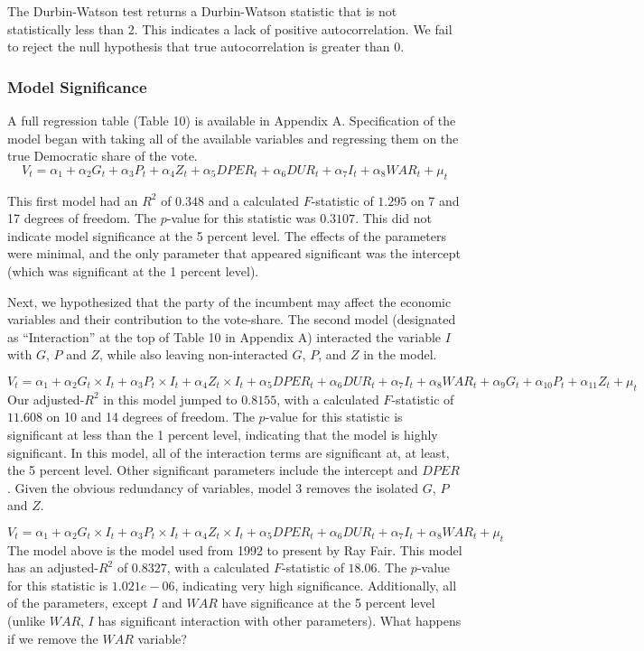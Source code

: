 \documentclass[11,]{article}
\begin{document}
The Durbin-Watson test returns a Durbin-Watson statistic that is not
statistically less than 2. This indicates a lack of positive
autocorrelation. We fail to reject the null hypothesis that true
autocorrelation is greater than 0.

\hypertarget{model-significance}{%
\subsubsection{Model Significance}\label{model-significance}}

A full regression table (Table 10) is available in Appendix A.
Specification of the model began with taking all of the available
variables and regressing them on the true Democratic share of the vote.
\[V_t = \alpha_1 + \alpha_2 G_t + \alpha_3 P_t + \alpha_4 Z_t+ \alpha_5 {DPER_t} + \alpha_6 {DUR_t} +\alpha_7 I_t + \alpha_8 {WAR_t} + \mu_t\]

This first model had an \(R^2\) of \(0.348\) and a calculated
\(F\)-statistic of \(1.295\) on 7 and 17 degrees of freedom. The
\(p\)-value for this statistic was \(0.3107\). This did not indicate
model significance at the 5 percent level. The effects of the parameters
were minimal, and the only parameter that appeared significant was the
intercept (which was significant at the 1 percent level).

Next, we hypothesized that the party of the incumbent may affect the
economic variables and their contribution to the vote-share. The second
model (designated as ``Interaction'' at the top of Table 10 in Appendix
A) interacted the variable \(I\) with \(G\), \(P\) and \(Z\), while also
leaving non-interacted \(G\), \(P\), and \(Z\) in the model.

\[V_t = \alpha_1 + \alpha_2 G_t\times I_t + \alpha_3 P_t\times I_t + \alpha_4 Z_t\times I_t + \alpha_5 {DPER_t} + \alpha_6 {DUR_t} +\alpha_7 I_t + \alpha_8 {WAR_t} + \alpha_9 G_t + \alpha_{10} P_t + \alpha_{11} Z_t + \mu_t\]
Our adjusted-\(R^2\) in this model jumped to \(0.8155\), with a
calculated \(F\)-statistic of \(11.608\) on 10 and 14 degrees of
freedom. The \(p\)-value for this statistic is significant at less than
the 1 percent level, indicating that the model is highly significant. In
this model, all of the interaction terms are significant at, at least,
the 5 percent level. Other significant parameters include the intercept
and \(DPER\). Given the obvious redundancy of variables, model 3 removes
the isolated \(G\), \(P\) and \(Z\).

\[V_t = \alpha_1 + \alpha_2 G_t\times I_t + \alpha_3 P_t\times I_t + \alpha_4 Z_t\times I_t + \alpha_5 {DPER_t} + \alpha_6 {DUR_t} +\alpha_7 I_t + \alpha_8 {WAR_t} + \mu_t\]
The model above is the model used from 1992 to present by Ray Fair. This
model has an adjusted-\(R^2\) of \(0.8327\), with a calculated
\(F\)-statistic of \(18.06\). The \(p\)-value for this statistic is
\(1.021e-06\), indicating very high significance. Additionally, all of
the parameters, except \(I\) and \(WAR\) have significance at the 5
percent level (unlike \(WAR\), \(I\) has significant interaction with
other parameters). What happens if we remove the \(WAR\) variable?
\end{document}
